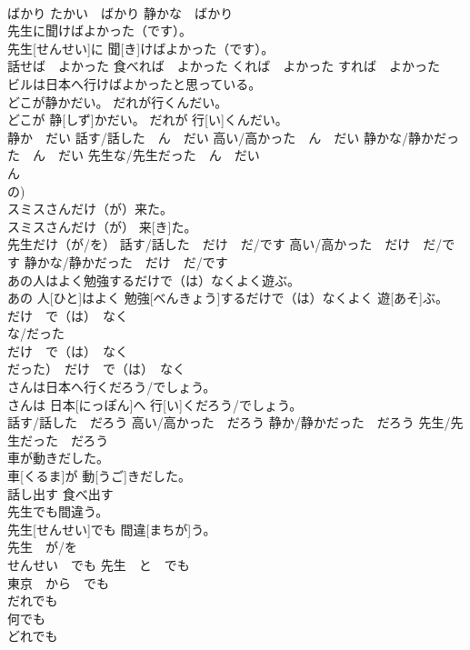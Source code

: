 \documentclass[8pt]{extreport}
\begin{document}
\begin{CJK}{UTF8}{min}
\\	ばかり たかい　ばかり 静かな　ばかり	
\\	先生に聞けばよかった（です）。	
\\	先生[せんせい]に 聞[き]けばよかった（です）。	
\\	話せば　よかった 食べれば　よかった くれば　よかった すれば　よかった	
\\	ビルは日本へ行けばよかったと思っている。 
\\	どこが静かだい。 だれが行くんだい。	
\\	どこが 静[しず]かだい。 だれが 行[い]くんだい。	
\\	静か　だい 話す/話した　ん　だい 高い/高かった　ん　だい 静かな/静かだった　ん　だい 先生な/先生だった　ん　だい	
\\	ん 
\\	の) 
\\	スミスさんだけ（が）来た。	
\\	スミスさんだけ（が） 来[き]た。	
\\	先生だけ（が/を） 話す/話した　だけ　だ/です 高い/高かった　だけ　だ/です 静かな/静かだった　だけ　だ/です	
\\	あの人はよく勉強するだけで（は）なくよく遊ぶ。	
\\	あの 人[ひと]はよく 勉強[べんきょう]するだけで（は）なくよく 遊[あそ]ぶ。	
\\	だけ　で（は）　なく 
\\	な/だった 
\\	だけ　で（は）　なく 
\\	だった）　だけ　で（は）　なく	
\\	さんは日本へ行くだろう/でしょう。	
\\	さんは 日本[にっぽん]へ 行[い]くだろう/でしょう。	
\\	話す/話した　だろう 高い/高かった　だろう 静か/静かだった　だろう 先生/先生だった　だろう	
\\	車が動きだした。	
\\	車[くるま]が 動[うご]きだした。	
\\	話し出す 食べ出す	
\\	先生でも間違う。	
\\	先生[せんせい]でも 間違[まちが]う。	
\\	先生　が/を　
\\	せんせい　でも 先生　と　でも 
\\	東京　から　でも 
\\	だれでも　
\\	何でも 
\\	どれでも 

\end{CJK}
\end{document}
